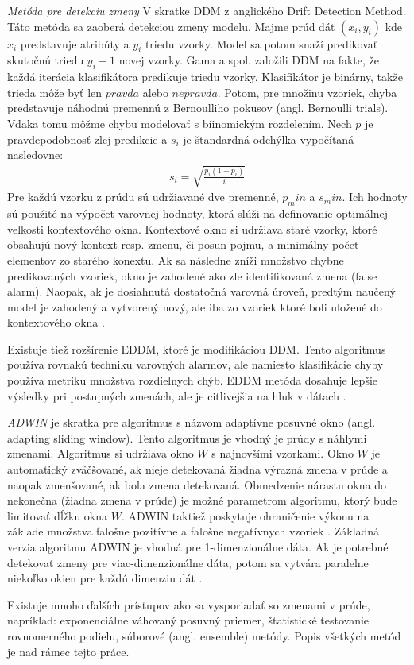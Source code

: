\textit{Metóda pre detekciu zmeny} V skratke DDM z anglického Drift Detection Method. Táto metóda sa zaoberá detekciou zmeny modelu. Majme prúd dát $(x_i,y_i)$ kde $x_i$ predstavuje atribúty a $y_i$ triedu vzorky. Model sa potom snaží predikovať skutočnú triedu $y_i+1$ novej vzorky. Gama a spol. založili DDM na fakte, že každá iterácia klasifikátora predikuje triedu vzorky. Klasifikátor je binárny, takže trieda môže byť len $pravda$ alebo $nepravda$. Potom, pre množinu vzoriek, chyba predstavuje náhodnú premennú z Bernoulliho pokusov (angl. Bernoulli trials). Vďaka tomu môžme chybu modelovať s bíinomickým rozdelením. Nech $p$ je pravdepodobnosť zlej predikcie a $s_i$ je štandardná odchýlka vypočítaná nasledovne:
\begin{align*}
s_i = \sqrt{ \frac{p_i(1-p_i)} {i} }
\end{align*}
Pre každú vzorku z prúdu sú udržiavané dve premenné, $p_min$ a $s_min$. Ich hodnoty sú použité na výpočet varovnej hodnoty, ktorá slúži na definovanie optimálnej velkosti kontextového okna. Kontextové okno si udržiava staré vzorky, ktoré obsahujú nový kontext resp. zmenu, či posun pojmu, a minimálny počet elementov zo starého konextu. Ak sa následne zníži množstvo chybne predikovaných vzoriek, okno je zahodené ako zle identifikovaná zmena (false alarm). Naopak, ak je dosiahnutá dostatočná varovná úroveň, predtým naučený model je zahodený a vytvorený nový, ale iba zo vzoriek ktoré boli uložené do kontextového okna \citep{gama2004learning, brzezinski2010mining}.
\par
Existuje tiež rozšírenie EDDM, ktoré je modifikáciou DDM. Tento algoritmus používa rovnakú techniku varovných alarmov, ale namiesto klasifikácie chyby používa metriku množstva rozdielnych chýb. EDDM metóda dosahuje lepšie výsledky pri postupných zmenách, ale je citlivejšia na hluk v dátach \citep{wadewale2015survey}.

\textit{ADWIN} je skratka pre algoritmus s názvom adaptívne posuvné okno (angl. adapting sliding window). Tento algoritmus je vhodný je prúdy s náhlymi zmenami. Algoritmus si udržiava okno $W$ s najnovšími vzorkami. Okno $W$ je automatický zväčšované, ak nieje detekovaná žiadna výrazná zmena v prúde a naopak zmenšované, ak bola zmena detekovaná. Obmedzenie nárastu okna do nekonečna (žiadna zmena v prúde) je možné parametrom algoritmu, ktorý bude limitovať dĺžku okna $W$. ADWIN taktiež poskytuje ohraničenie výkonu na základe množstva falošne pozitívne a falošne negatívnych vzoriek \citep{wadewale2015survey}. Základná verzia algoritmu ADWIN je vhodná pre 1-dimenzionálne dáta. Ak je potrebné detekovať zmeny pre viac-dimenzionálne dáta, potom sa vytvára paralelne niekoľko okien pre každú dimenziu dát \citep{brzezinski2010mining}.
\par
Existuje mnoho ďalších prístupov ako sa vysporiadať so zmenami v prúde, napríklad: exponenciálne váhovaný posuvný priemer, štatistické testovanie rovnomerného podielu, súborové (angl. ensemble) metódy. Popis všetkých metód je nad rámec tejto práce.



